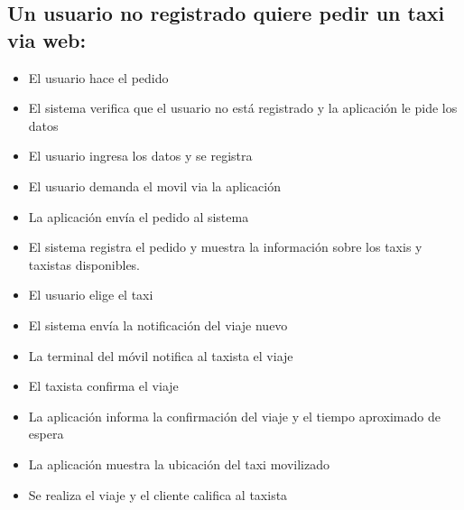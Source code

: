 \documentclass[a4paper]{article}
\begin{document}
\subsection{Un usuario no registrado quiere pedir un taxi via web:}
\begin{itemize}
\item El usuario hace el pedido
\item El sistema verifica que el usuario no est\'a registrado y la aplicaci\'on le pide los datos
\item El usuario ingresa los datos y se registra
\item El usuario demanda el movil via la aplicaci\'on
\item La aplicaci\'on env\'ia el pedido al sistema
\item El sistema registra el pedido y muestra la informaci\'on sobre los taxis y taxistas disponibles.
\item El usuario elige el taxi
\item El sistema env\'ia la notificaci\'on del viaje nuevo
\item La terminal del m\'ovil notifica al taxista el viaje
\item El taxista confirma el viaje
\item La aplicaci\'on informa la confirmaci\'on del viaje y el tiempo aproximado de espera
\item La aplicaci\'on muestra la ubicaci\'on del taxi movilizado
\item Se realiza el viaje y el cliente califica al taxista
\end{itemize}
\end{document}
